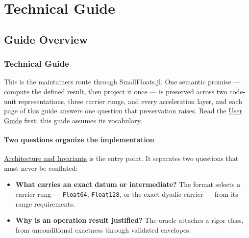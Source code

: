 \part{Technical Guide}


\chapter{Guide Overview}


\section{Technical Guide}



\label{4463396622184713734}{}


This is the maintainer{\textquotesingle}s route through SmallFloats.jl. One semantic promise — compute the defined result, then project it once — is preserved across two code-unit representations, three carrier rungs, and every acceleration layer, and each page of this guide answers one question that preservation raises. Read the \href{user\_\allowbreak{}guide.md}{User Guide} first; this guide assumes its vocabulary.



\subsection{Two questions organize the implementation}



\label{14492664506161300181}{}


\href{internals\_\allowbreak{}architecture.md}{Architecture and Invariants} is the entry point. It separates two questions that must never be conflated:



\begin{itemize}
\item[1. ] \textbf{What carries an exact datum or intermediate?} The format selects a carrier rung — \texttt{Float64}, \texttt{Float128}, or the exact dyadic carrier — from its range requirements.


\item[2. ] \textbf{Why is an operation result justified?} The oracle attaches a rigor class, from unconditional exactness through validated envelopes.

\end{itemize}


